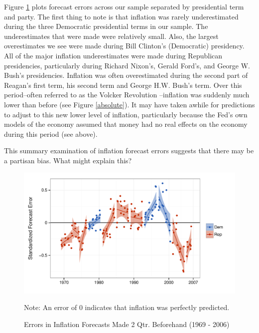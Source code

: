 \documentclass[a4paper]{article}\usepackage{graphicx, color}
\newenvironment{knitrout}{}{} %
\begin{document}
Figure \ref{errors_over_time} plots forecast errors across our sample separated by presidential term and party. The first thing to note is that inflation was rarely underestimated during the three Democratic presidential terms in our sample. The underestimates that were made were relatively small. Also, the largest overestimates we see were made during Bill Clinton's (Democratic) presidency. All of the major inflation underestimates were made during Republican presidencies, particularly during Richard Nixon's, Gerald Ford's, and George W. Bush's presidencies. Inflation was often overestimated during the second part of Reagan's first term, his second term and George H.W. Bush's term. Over this period--often referred to as the Volcker Revolution \citep[see][]{Bartels1985}--inflation was suddenly much lower than before (see Figure \ref{absolute}). It may have taken awhile for predictions to adjust to this new lower level of inflation, particularly because the Fed's own models of the economy assumed that money had no real effects on the economy during this period (see above).

This summary examination of inflation forecast errors suggests that there may be a partisan bias. What might explain this?

\begin{figure}[t]
    \caption{Errors in Inflation Forecasts Made 2 Qtr. Beforehand (1969 - 2006)}
    \label{errors_over_time}
    \begin{center}
    
\begin{knitrout}
\color{fgcolor}

{\centering \includegraphics[width=0.8\linewidth]{figure/PartisanError} 

}



\end{knitrout}

    
    \end{center}
    \begin{singlespace}
        {\scriptsize{Note: An error of 0 indicates that inflation was perfectly predicted.}}
    \end{singlespace}
\end{figure}
\end{document}
